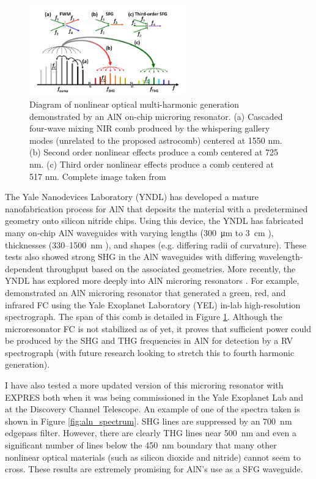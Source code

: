 \documentclass[11pt]{article}
\begin{document}
\begin{figure}
    \centering
    \includegraphics[width=0.6\textwidth]{images/sfg_example.png}
    \caption{Diagram of nonlinear optical multi-harmonic generation demonstrated by an AlN on-chip microring resonator. (a) Cascaded four-wave mixing NIR comb produced by the whispering gallery modes (unrelated to the proposed astrocomb) centered at 1550 nm. (b) Second order nonlinear effects produce a comb centered at 725 nm. (c) Third order nonlinear effects produce a comb centered at 517 nm. Complete image taken from \cite{Jung2014a}}
    \label{fig:sfg_example}
\end{figure}

The Yale Nanodevices Laboratory (YNDL) has developed a mature nanofabrication process for AlN that deposits the material with a predetermined geometry onto silicon nitride chips. Using this device, the YNDL has fabricated many on-chip AlN waveguides with varying lengths (\SI{300}{\micro\meter} to \SI{3}{\centi\meter} \citep{Xiong2012a}), thicknesses (330--\SI{1500}{\nano\meter} \citep{Pernice2012}), and shapes (e.g. differing radii of curvature). These tests also showed strong SHG in the AlN waveguides with differing wavelength-dependent throughput based on the associated geometries. More recently, the YNDL has explored more deeply into AlN microring resonators \citep{Jung2013, Guo2016}. For example, \citep{Jung2014a} demonstrated an AlN microring resonator that generated a green, red, and infrared FC using the Yale Exoplanet Laboratory (YEL) in-lab high-resolution spectrograph. The span of this comb is detailed in Figure \ref{fig:sfg_example}. Although the microresonator FC is not stabilized as of yet, it proves that sufficient power could be produced by the SHG and THG frequencies in AlN for detection by a RV spectrograph (with future research looking to stretch this to fourth harmonic generation).

I have also tested a more updated version of this microring resonator with EXPRES both when it was being commissioned in the Yale Exoplanet Lab and at the Discovery Channel Telescope. An example of one of the spectra taken is shown in Figure \ref{fig:aln_spectrum}. SHG lines are suppressed by an \SI{700}{\nano\meter} edgepass filter. However, there are clearly THG lines near \SI{500}{\nano\meter} and even a significant number of lines below the \SI{450}{\nano\meter} boundary that many other nonlinear optical materials (such as silicon dioxide and nitride) cannot seem to cross. These results are extremely promising for AlN's use as a SFG waveguide.
\end{document}
